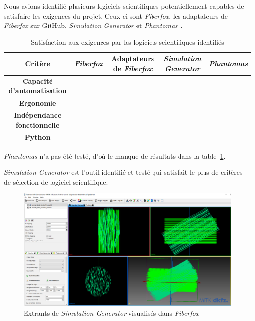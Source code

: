 \documentclass{article}
\newcommand{\cmark}{\ding{51}}
\newcommand{\xmark}{\ding{55}}
\begin{document}
  Nous avions identifié plusieurs logiciels scientifiques potentiellement capables de satisfaire les exigences du projet.
  Ceux-ci sont \textit{Fiberfox}, les adaptateurs de \textit{Fiberfox} sur GitHub, \textit{Simulation Generator} et \textit{Phantomas}~\cite{caruyer2014phantomas}.

  \begin{table}[H]

    \caption{Satisfaction aux exigences par les logiciels scientifiques identifiés}
    \centering

    \begin{tabular}{ |c| c c c c | }
      \toprule

      Critère
      & \textit{Fiberfox}
      & Adaptateurs de \textit{Fiberfox}
      & \textit{Simulation Generator}
      & \textit{Phantomas} \\

      \midrule

      \textbf{Capacité d'automatisation}  & \xmark & \cmark & \cmark & - \\
      \textbf{Ergonomie}                  & \xmark & \xmark & \cmark & - \\
      \textbf{Indépendance fonctionnelle} & \xmark & \xmark & \cmark & - \\
      \textbf{Python}                     & \xmark & \cmark & \cmark & - \\

      \bottomrule
    \end{tabular}
    \label{tab:tab1}

  \end{table}

  \textit{Phantomas} n'a pas été testé, d'où le manque de résultats dans la table~\ref{tab:tab1}.

  \textit{Simulation Generator} est l'outil identifié et testé qui satisfait le plus de critères de sélection de logiciel scientifique.

  \begin{figure}[H]
    \centering
    \includegraphics[width=\textwidth]{simulation_generator_results}
    \caption{Extrants de \textit{Simulation Generator} visualisés dans \textit{Fiberfox}}
    \label{fig:fig1}
  \end{figure}
\end{document}
